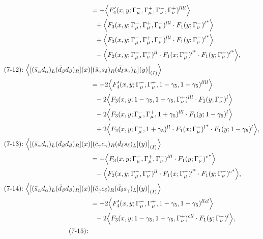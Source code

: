 \begin{align}
&=
 - \Big\langle F_4'(x,y;\Gamma_\mu^-,\Gamma_\mu^+,\Gamma_\nu^-,\Gamma_\nu^+)^{llll}\Big\rangle
\notag\\*&\ \ 
 + \Big\langle F_3(x,y;\Gamma_\mu^-,\Gamma_\mu^+,\Gamma_\nu^-)^{lll} \cdot {F_1(y;\Gamma_\nu^-)^l}^*\Big\rangle
\notag\\*&\ \ 
 + \Big\langle F_3(x,y;\Gamma_\mu^-,\Gamma_\mu^+,\Gamma_\nu^-)^{lll} \cdot {F_1(y;\Gamma_\nu^-)^l}^*\Big\rangle
\notag\\*&\ \ 
 - \Big\langle F_2(x,y;\Gamma_\mu^-,\Gamma_\nu^-)^{ll} \cdot {F_1(x;\Gamma_\mu^-)^l}^* \cdot {F_1(y;\Gamma_\nu^-)^l}^*\Big\rangle,
\\
\mbox{(7-12):}\ 
\Big\langle
[(\bar s_\alpha d_\alpha)_L(\bar d_\beta d_\beta)_R](x)&
[(\bar s_\gamma s_\delta)_R(\bar d_\delta s_\gamma)_L](y)\big|_{(I)}
\Big\rangle
\notag\\*
&=
 + 2\Big\langle F_4'(x,y;\Gamma_\mu^-,\Gamma_\mu^+,1-\gamma_5,1+\gamma_5)^{llll}\Big\rangle
\notag\\*&\ \ 
-2\Big\langle F_3(x,y;1-\gamma_5,1+\gamma_5,\Gamma_\nu^+)^{lll} \cdot F_1(y;\Gamma_\nu^-)^l\Big\rangle
\notag\\*&\ \ 
-2\Big\langle F_3(x,y;\Gamma_\mu^-,\Gamma_\mu^+,1+\gamma_5)^{lll} \cdot F_1(y;1-\gamma_5)^l\Big\rangle
\notag\\*&\ \ 
 + 2\Big\langle F_2(x,y;\Gamma_\mu^-,1+\gamma_5)^{ll} \cdot {F_1(x;\Gamma_\mu^-)^l}^* \cdot F_1(y;1-\gamma_5)^l\Big\rangle,
\\
\mbox{(7-13):}\ 
\Big\langle
[(\bar s_\alpha d_\alpha)_L(\bar d_\beta d_\beta)_R](x)&
[(\bar c_\gamma c_\gamma)_R(\bar d_\delta s_\delta)_L](y)\big|_{(I)}
\Big\rangle
\notag\\*
&=
 + \Big\langle F_3(x,y;\Gamma_\mu^-,\Gamma_\mu^+,\Gamma_\nu^-)^{lll} \cdot {F_1(y;\Gamma_\nu^-)^c}^*\Big\rangle
\notag\\*&\ \ 
 - \Big\langle F_2(x,y;\Gamma_\mu^-,\Gamma_\nu^-)^{ll} \cdot {F_1(x;\Gamma_\mu^-)^l}^* \cdot {F_1(y;\Gamma_\nu^-)^c}^*\Big\rangle,
\\
\mbox{(7-14):}\ 
\Big\langle
[(\bar s_\alpha d_\alpha)_L(\bar d_\beta d_\beta)_R](x)&
[(\bar c_\gamma c_\delta)_R(\bar d_\delta s_\gamma)_L](y)\big|_{(I)}
\Big\rangle
\notag\\*
&=
 + 2\Big\langle F_4'(x,y;\Gamma_\mu^-,\Gamma_\mu^+,1-\gamma_5,1+\gamma_5)^{llcl}\Big\rangle
\notag\\*&\ \ 
-2\Big\langle F_3(x,y;1-\gamma_5,1+\gamma_5,\Gamma_\nu^+)^{cll} \cdot F_1(y;\Gamma_\nu^-)^l\Big\rangle,
\\
\mbox{(7-15):}\ 

\end{align}
